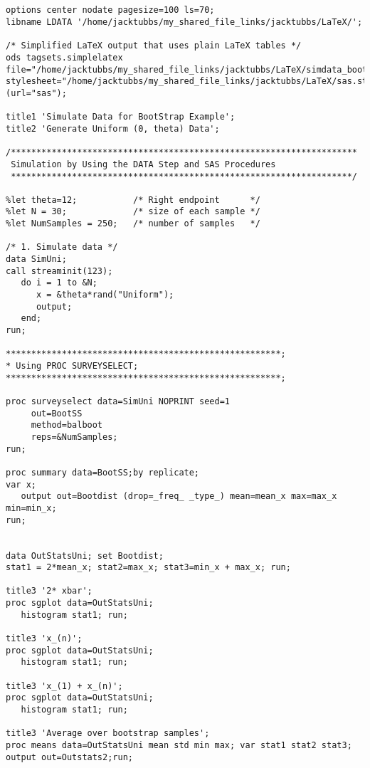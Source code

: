 \begin{lstlisting}[language=SAS]


options center nodate pagesize=100 ls=70;
libname LDATA '/home/jacktubbs/my_shared_file_links/jacktubbs/LaTeX/';

/* Simplified LaTeX output that uses plain LaTeX tables */
ods tagsets.simplelatex 
file="/home/jacktubbs/my_shared_file_links/jacktubbs/LaTeX/simdata_boot.tex" 
stylesheet="/home/jacktubbs/my_shared_file_links/jacktubbs/LaTeX/sas.sty"(url="sas");

title1 'Simulate Data for BootStrap Example';
title2 'Generate Uniform (0, theta) Data';

/********************************************************************
 Simulation by Using the DATA Step and SAS Procedures
 *******************************************************************/

%let theta=12;           /* Right endpoint      */
%let N = 30;             /* size of each sample */
%let NumSamples = 250;   /* number of samples   */  

/* 1. Simulate data */
data SimUni;
call streaminit(123);
   do i = 1 to &N;
      x = &theta*rand("Uniform");
      output;
   end;
run;

******************************************************;
* Using PROC SURVEYSELECT;
******************************************************;

proc surveyselect data=SimUni NOPRINT seed=1       
     out=BootSS                                    
     method=balboot                         
     reps=&NumSamples;                                                                        
run;

proc summary data=BootSS;by replicate;
var x;
   output out=Bootdist (drop=_freq_ _type_) mean=mean_x max=max_x min=min_x;
run;


data OutStatsUni; set Bootdist; 
stat1 = 2*mean_x; stat2=max_x; stat3=min_x + max_x; run;

title3 '2* xbar';
proc sgplot data=OutStatsUni;
   histogram stat1; run;

title3 'x_(n)';
proc sgplot data=OutStatsUni;
   histogram stat1; run;

title3 'x_(1) + x_(n)';
proc sgplot data=OutStatsUni;
   histogram stat1; run;

title3 'Average over bootstrap samples';
proc means data=OutStatsUni mean std min max; var stat1 stat2 stat3; 
output out=Outstats2;run;

\end{lstlisting}
